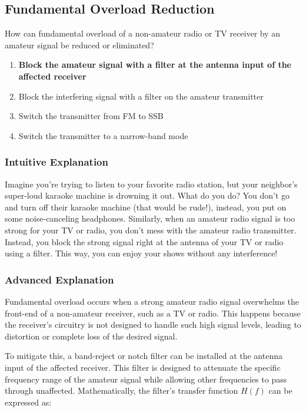 \subsection{Fundamental Overload Reduction}
\label{T7B05}

\begin{tcolorbox}[colback=gray!10!white,colframe=black!75!black,title=T7B05]
How can fundamental overload of a non-amateur radio or TV receiver by an amateur signal be reduced or eliminated?
\begin{enumerate}[label=\Alph*)]
    \item \textbf{Block the amateur signal with a filter at the antenna input of the affected receiver}
    \item Block the interfering signal with a filter on the amateur transmitter
    \item Switch the transmitter from FM to SSB
    \item Switch the transmitter to a narrow-band mode
\end{enumerate}
\end{tcolorbox}

\subsubsection{Intuitive Explanation}
Imagine you're trying to listen to your favorite radio station, but your neighbor's super-loud karaoke machine is drowning it out. What do you do? You don’t go and turn off their karaoke machine (that would be rude!), instead, you put on some noise-canceling headphones. Similarly, when an amateur radio signal is too strong for your TV or radio, you don’t mess with the amateur radio transmitter. Instead, you block the strong signal right at the antenna of your TV or radio using a filter. This way, you can enjoy your shows without any interference!

\subsubsection{Advanced Explanation}
Fundamental overload occurs when a strong amateur radio signal overwhelms the front-end of a non-amateur receiver, such as a TV or radio. This happens because the receiver's circuitry is not designed to handle such high signal levels, leading to distortion or complete loss of the desired signal.

To mitigate this, a band-reject or notch filter can be installed at the antenna input of the affected receiver. This filter is designed to attenuate the specific frequency range of the amateur signal while allowing other frequencies to pass through unaffected. Mathematically, the filter's transfer function \( H(f) \) can be expressed as:

